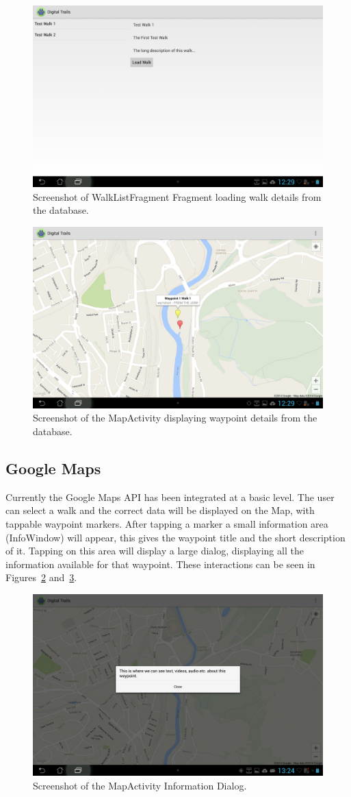 \documentclass[11pt,a4paper]{article}
\begin{document}
\begin{figure}[H]
\centering
\includegraphics[angle=90, width=.5\linewidth]{walkListFragment.jpg}
\caption{Screenshot of WalkListFragment Fragment loading walk details from the database.}
\label{fig:walkListFragment}
\end{figure}


\begin{figure}[H]
\centering
\includegraphics[angle=90, width=.6\linewidth]{googleMapsContentLoader.jpg}
\caption{Screenshot of the MapActivity displaying waypoint details from the database.}
\label{fig:googleContentLoader}
\end{figure}


\subsection{Google Maps}
\label{sec:googlemaps}
Currently the Google Maps API has been integrated at a basic level. The user can select a walk and the correct data will be displayed on the Map, with tappable waypoint markers. After tapping a marker a small information area (InfoWindow) will appear, this gives the waypoint title and the short description of it. Tapping on this area will display a large dialog, displaying all the information available for that waypoint. These interactions can be seen in Figures~\ref{fig:googleContentLoader} and~\ref{fig:wpInfoDialog}.

\begin{figure}[H]
\centering
\includegraphics[angle=90, width=.6\linewidth]{wpInfoDialog.jpg}
\caption{Screenshot of the MapActivity Information Dialog.}
\label{fig:wpInfoDialog}
\end{figure}
\end{document}
